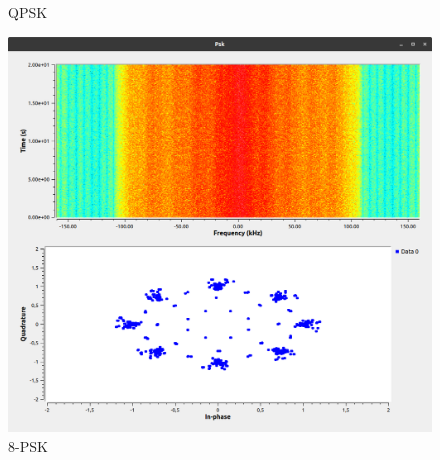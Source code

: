 \begin{figure}[!htb]
	\caption{QPSK}\label{fig:QPSK}
	\endminipage\hfill
	\includegraphics[width=\linewidth]{pics/8-PSK}
	\caption{8-PSK}\label{fig:8-PSK}
	\endminipage
\end{figure}

